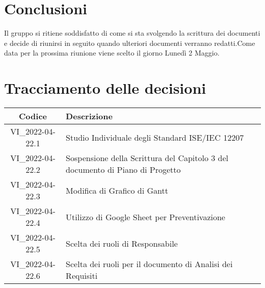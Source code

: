\section{Conclusioni}
	Il gruppo si ritiene soddisfatto di come si sta svolgendo la scrittura dei documenti e decide di riunirsi in seguito quando ulteriori documenti verranno redatti.Come data per la prossima riunione viene scelto il giorno Lunedì 2 Maggio.
\newpage

\section*{Tracciamento delle decisioni}
	\renewcommand{\arraystretch}{1.8} %
	\begin{tabular}{ |c|l| }
		\hline
		\textbf{Codice} & \textbf{Descrizione} \\
		\hline
		VI\_2022-04-22.1 & Studio Individuale degli Standard ISE/IEC 12207\\ 
		\hline
		VI\_2022-04-22.2 & Sospensione della Scrittura del Capitolo 3 del documento di Piano di Progetto \\ 
		\hline
		VI\_2022-04-22.3 & Modifica di Grafico di Gantt\\ 
		\hline
		VI\_2022-04-22.4 & Utilizzo di Google Sheet per Preventivazione\\ 
		\hline
		VI\_2022-04-22.5 & Scelta dei ruoli di Responsabile\\ 
		\hline
		VI\_2022-04-22.6 & Scelta dei ruoli per il documento di Analisi dei Requisiti\\ 
		\hline
	\end{tabular}